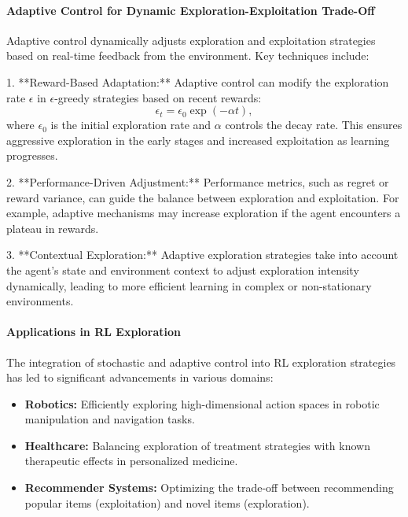 \documentclass{IEEEojcsys}
\begin{document}
\paragraph{Adaptive Control for Dynamic Exploration-Exploitation Trade-Off}
Adaptive control dynamically adjusts exploration and exploitation strategies based on real-time feedback from the environment. Key techniques include:

1. **Reward-Based Adaptation:**
   Adaptive control can modify the exploration rate $\epsilon$ in $\epsilon$-greedy strategies based on recent rewards:
   \[
   \epsilon_t = \epsilon_0 \exp(-\alpha t),
   \]
   where $\epsilon_0$ is the initial exploration rate and $\alpha$ controls the decay rate. This ensures aggressive exploration in the early stages and increased exploitation as learning progresses.

2. **Performance-Driven Adjustment:**
   Performance metrics, such as regret or reward variance, can guide the balance between exploration and exploitation. For example, adaptive mechanisms may increase exploration if the agent encounters a plateau in rewards.

3. **Contextual Exploration:**
   Adaptive exploration strategies take into account the agent's state and environment context to adjust exploration intensity dynamically, leading to more efficient learning in complex or non-stationary environments.

\paragraph{Applications in RL Exploration}
The integration of stochastic and adaptive control into RL exploration strategies has led to significant advancements in various domains:
\begin{itemize}
    \item \textbf{Robotics:} Efficiently exploring high-dimensional action spaces in robotic manipulation and navigation tasks.
    \item \textbf{Healthcare:} Balancing exploration of treatment strategies with known therapeutic effects in personalized medicine.
    \item \textbf{Recommender Systems:} Optimizing the trade-off between recommending popular items (exploitation) and novel items (exploration).
\end{itemize}
\end{document}
